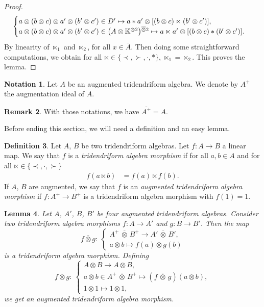 \documentclass[10pt,a4paper]{amsart}
\numberwithin{equation}{section}
\theoremstyle{definition}
\newtheorem{defi}{Definition}[section]
\newtheorem{Rq}[defi]{Remark}
\newtheorem{Not}[defi]{Notation}
\theoremstyle{plain}
\newtheorem{Lemme}[defi]{Lemma}
\newcommand{\K}{\mathbb{K}}
\begin{document}
\begin{proof}
\begin{equation*}
\begin{cases}
	a\otimes (b\otimes c) \otimes a'\otimes(b'\otimes c')\in D' \mapsto 	a*a'\otimes [(b\otimes c)\ltimes (b'\otimes c')], \\
	a\otimes (b\otimes c) \otimes a'\otimes(b'\otimes c')\in\smash{\big(A\otimes\K^{\otimes 2 }\big)}^{\overline{\otimes} 2} \mapsto 	a\ltimes a'\otimes [(b\otimes c)* (b'\otimes c')].
	\end{cases}
\end{equation*}
By linearity of $\ltimes_1$ and $\ltimes_2$, for all $x\in \overline{A}$.
Then doing some straightforward computations, we obtain for all $\ltimes\in\{\prec,\succ,\cdot,*\}$, $\ltimes_1=\ltimes_2$. This proves the lemma.
\end{proof}

\begin{Not}
	Let $A$ be an augmented tridendriform algebra. We denote by $A^+$ the augmentation ideal of $A$.
\end{Not}
 \begin{Rq}
 	With those notations, we have $\overline{A^+}=A$.
 \end{Rq}
 Before ending this section, we will need a definition and an easy lemma.
 \begin{defi}
 	Let $A$, $B$ be two tridendriform algebras. Let $f\colon A\rightarrow B$ a linear map.
 	We say that $f$ is a \emph{tridendriform algebra morphism} if for all $a,b\in A$ and for all $\ltimes\in\{\prec,\cdot,\succ\}$
 	\begin{align*}
 		f(a\ltimes b)&=f(a)\ltimes f(b).
 	\end{align*}
 	If $A$, $B$ are augmented, we say that $f$ is an \emph{augmented tridendriform algebra morphism} if $f\colon A^+\rightarrow B^+$ is a tridendriform algebra morphism with $f(1)=1.$
 \end{defi}
 \begin{Lemme}\label{Lemme:morphtridend}
 	Let $A$, $A'$, $B$, $B'$ be four augmented tridendriform algebras. Consider two tridendriform algebra morphisms $f\colon A\rightarrow A'$ and $g\colon B\rightarrow B'$. Then the map
 	\begin{equation*}
 		f\overline{\otimes} g \colon \ \begin{cases}
 			A^+\,\overline{\otimes}\, B^+ \rightarrow A'\,\overline{\otimes}\, B', \\
 			a\otimes b \mapsto f(a)\otimes g(b)
 		\end{cases}
 	\end{equation*}
 	is a tridendriform algebra morphism. Defining
 	\begin{equation*}
 		f\otimes g \colon \ \begin{cases}
 			A\otimes B \rightarrow A\otimes B, \\
 			a\otimes b\in A^+\,\overline{\otimes}\, B^+ \mapsto (f\,\overline{\otimes}\, g)(a\otimes b), \\
 			1\otimes 1 \mapsto 1\otimes 1,
 		\end{cases}
 	\end{equation*}
 	we get an augmented tridendriform algebra morphism.
 \end{Lemme}
\end{document}
